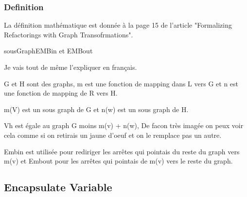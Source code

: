 \documentclass[a4paper, 10pt]{article}
\begin{document}
\subsubsection{Definition}

La définition mathématique est donnée à la page 15 de l'article "Formalizing Refactorings with Graph Transofrmations".

\begin{myfig}{sousGraph}{EMBin et EMBout}
\tikzset{>=latex}

\end{myfig}

Je vais tout de même l'expliquer en français.

G et H sont des graphs, m est une fonction de mapping dans L vers G et n est une fonction de mapping de R vers H.

m(V) est un sous graph de G et n(w) est un sous graph de H.

Vh est égale au graph G moins m(v) + n(w), De facon très imagée on peux voir cela comme si on retirais un jaune d'oeuf et on le remplace pas un autre.

Embin est utilisée pour rediriger les arrêtes qui pointais du reste du graph vers m(v) et Embout pour les arrêtes qui pointais de m(v) vers le reste du graph.


\subsection{Encapsulate Variable}
\end{document}
